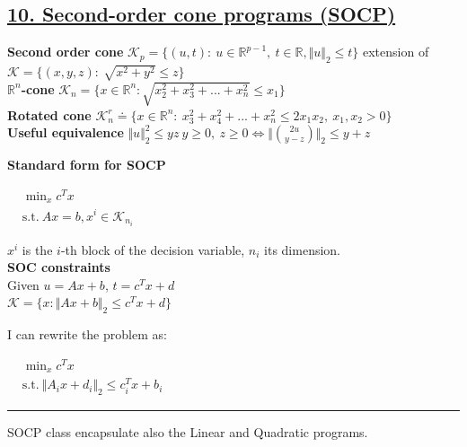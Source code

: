 \documentclass[a4paper]{article}
\begin{document}
\subsection*{\underline{10. Second-order cone programs (SOCP)}}
\textbf{Second order cone} $\mathcal{K}_p=\{(u,t): \ u\in\mathbb{R}^{p-1}, \ t\in\mathbb{R}, \Vert u \Vert_2\le{t}\}$ extension of 
$\mathcal{K}=\{(x,y,z): \ \sqrt{x^2+y^2}\le{z}\}$\\
\textbf{$\mathbb{R}^n$-cone} $\mathcal{K}_n =\{x\in\mathbb{R}^n: \sqrt{x_2^2+x_3^2+...+x_n^2}\le{x_1}\}$\\
\textbf{Rotated cone} 
$\mathcal{K}_n^r\doteq\{x\in\mathbb{R}^n: \ x_3^2+x_4^2+...+x_n^2\le2x_1{x_2}, \ x_1, x_2 >0\}$\\
\textbf{Useful equivalence} $\Vert u \Vert_2^2 \le yz \ y\ge0, \ z\ge0 \iff \Vert \binom{2u}{y-z} \Vert_2 \le y+z$
\begin{multicols}{3}
    \noindent
    \textbf{Standard form for SOCP}
    \begin{center}
        $\begin{aligned}
            &\min_{x} c^T{x}\\
            &\text{s.t.} \ Ax=b, x^i \in \mathcal{K}_{n_i}
        \end{aligned}$
    \end{center}
    $x^i$ is the $i$-th block of the decision variable, $n_i$ its dimension.
    \newcolumn\\
    \textbf{SOC constraints}\\
    Given $u= Ax+b$, $t=c^T{x}+d$\\

    $\mathcal{K}=\{x: \Vert Ax+b \Vert_2 \le c^T{x}+d\}$
    \begin{center}
    \end{center}
    \newcolumn
    I can rewrite the problem as:
    \begin{center}
        $\begin{aligned}
            &\min_{x} {c^T{x}}\\
            &\text{s.t.} \ \Vert A_i{x}+d_i \Vert_2 \le c_i^T{x}+b_i
        \end{aligned}$
    \end{center}
    \hrule
    SOCP class encapsulate also the Linear and Quadratic programs.
\end{multicols}
\end{document}

